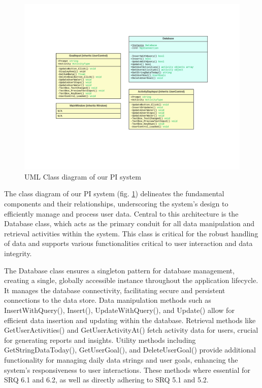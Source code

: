 \documentclass[12pt]{article}
\begin{document}
\begin{figure}[!ht]
  \centering
  \includegraphics[width = \linewidth]{UML Class diagram}
  \caption{UML Class diagram of our PI system}
  \label{fig:Class}
\end{figure}

The class diagram of our PI system (fig. \ref{fig:Class}) delineates the
fundamental components and their relationships, underscoring the system's
design to efficiently manage and process user data. Central to this
architecture is the Database class, which acts as the primary conduit for all
data manipulation and retrieval activities within the system. This class is
critical for the robust handling of data and supports various functionalities
critical to user interaction and data integrity.\par

The Database class ensures a singleton pattern for database management,
creating a single, globally accessible instance throughout the application
lifecycle. It manages the database connectivity, facilitating secure and
persistent connections to the data store. Data manipulation methods such as
InsertWithQuery(), Insert(), UpdateWithQuery(), and Update() allow for
efficient data insertion and updating within the database. Retrieval methods
like GetUserActivities() and GetUserActivityAt() fetch activity data for users,
crucial for generating reports and insights. Utility methods including
GetStringDataToday(), GetUserGoal(), and DeleteUserGoal() provide additional
functionality for managing daily data strings and user goals, enhancing the
system’s responsiveness to user interactions. These methods where essential for SRQ 6.1 and 6.2, as well as directly adhering to SRQ 5.1 and 5.2. \par
\end{document}
